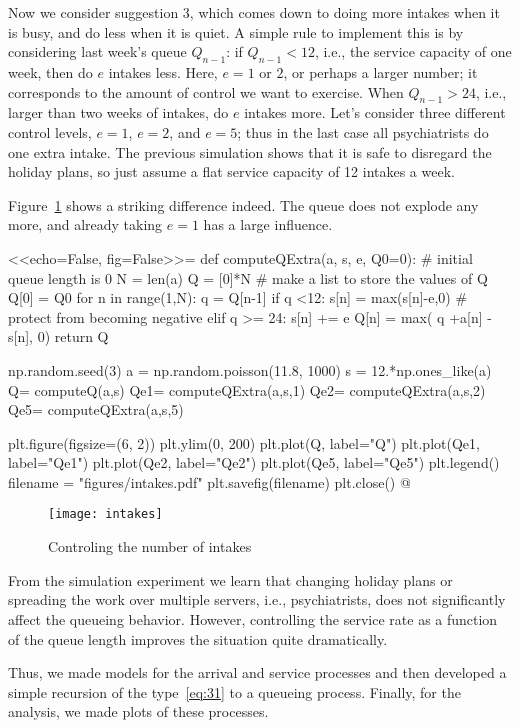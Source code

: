 Now we consider suggestion 3, which comes down to doing more intakes
when it is busy, and do less when it is quiet. A simple rule to
implement this is by considering last week's queue $Q_{n-1}$: if
$Q_{n-1}<12$, i.e., the service capacity of one week, then do $e$
intakes less. Here, $e=1$ or $2$, or perhaps a larger number; it
corresponds to the amount of control we want to exercise. When
$Q_{n-1}>24$, i.e., larger than two weeks of intakes, do $e$ intakes
more. Let's consider three different control levels, $e=1$, $e=2$, and
$e=5$; thus in the last case all psychiatrists do one extra intake.
The previous simulation shows that it is safe to disregard the holiday
plans, so just assume a flat service capacity of 12 intakes a week.

Figure~\ref{fig:intakes} shows a striking difference indeed. The queue
does not explode any more, and already taking $e=1$ has a large
influence. 

<<echo=False, fig=False>>=
def computeQExtra(a, s, e, Q0=0): #  initial queue length is 0
    N = len(a)
    Q = [0]*N # make a list to store the values of  Q
    Q[0] = Q0
    for n in range(1,N):
        q = Q[n-1]
        if  q <12:
            s[n] = max(s[n]-e,0) # protect from becoming negative
        elif q >= 24:
            s[n] += e
        Q[n] = max( q +a[n] - s[n], 0)
    return Q

np.random.seed(3)
a = np.random.poisson(11.8, 1000)
s = 12.*np.ones_like(a)
Q= computeQ(a,s)
Qe1= computeQExtra(a,s,1)
Qe2= computeQExtra(a,s,2)
Qe5= computeQExtra(a,s,5)

plt.figure(figsize=(6, 2))
plt.ylim(0, 200)
plt.plot(Q, label="Q")
plt.plot(Qe1, label="Qe1")
plt.plot(Qe2, label="Qe2")
plt.plot(Qe5, label="Qe5")
plt.legend()
filename = "figures/intakes.pdf"
plt.savefig(filename)
plt.close()
@ 

\begin{figure}[ht]
  \centering
\texttt{[image: intakes]}  
  \caption{Controling the number of intakes}
\label{fig:intakes}
\end{figure}

From the simulation experiment we learn that changing holiday plans or
spreading the work over multiple servers, i.e., psychiatrists, does
not significantly affect the queueing behavior.  However, controlling
the service rate as a function of the queue length improves the
situation quite dramatically. 

Thus, we made models for the arrival and service processes and then
developed a simple recursion of the type~\eqref{eq:31} to
 a queueing process. Finally, for the analysis, we
made plots of these processes. 



